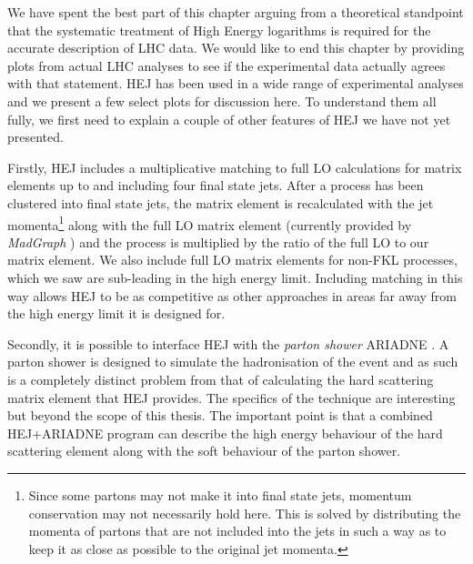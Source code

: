 We have spent the best part of this chapter arguing from a theoretical standpoint that the systematic treatment of High Energy logarithms is required for the accurate description of LHC data. We would like to end this chapter by providing plots from actual LHC analyses to see if the experimental data actually agrees with that statement. HEJ has been used in a wide range of experimental analyses \cite{Aad2011, Chatrchyan2012, Chatrchyan2012a,Abazov2013,Aad2014a,Aad2014,Aad2015} and we present a few select plots for discussion here. To understand them all fully, we first need to explain a couple of other features of HEJ we have not yet presented. 

Firstly, HEJ includes a multiplicative matching to full LO calculations for matrix elements up to and including four final state jets. After a process has been clustered into final state jets, the matrix element is recalculated with the jet momenta\footnote{Since some partons may not make it into final state jets, momentum conservation may not necessarily hold here. This is solved by distributing the momenta of partons that are not included into the jets in such a way as to keep it as close as possible to the original jet momenta.} along with the full LO matrix element (currently provided by \emph{MadGraph} \cite{Alwall2011}) and the process is multiplied by the ratio of the full LO to our matrix element. We also include full LO matrix elements for non-FKL processes, which we saw are sub-leading in the high energy limit. Including matching in this way allows HEJ to be as competitive as other approaches in areas far away from the high energy limit it is designed for. 

Secondly, it is possible to interface HEJ with the \emph{parton shower} ARIADNE \cite{Andersen2011}. A parton shower is designed to simulate the hadronisation of the event and as such is a completely distinct problem from that of calculating the hard scattering matrix element that HEJ provides. The specifics of the technique are interesting \cite{Hoche2014} but beyond the scope of this thesis. The important point is that a combined HEJ+ARIADNE program can describe the high energy behaviour of the hard scattering element along with the soft behaviour of the parton shower. 

